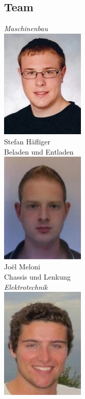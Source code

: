 \subsection{Team}

\begin{minipage}{0.49\textwidth}
\begin{flushleft} \large
\emph{Maschinenbau}\\
\includegraphics[width=0.3\textwidth]{./04_Projektmanagement/fig/stefanhaefliger.jpg}\\
Stefan Häfliger\\
Beladen und Entladen\\
\includegraphics[width=0.3\textwidth]{./04_Projektmanagement/fig/joelmeloni.jpg}\\
Joël Meloni\\
Chassis und Lenkung\\
\emph{Elektrotechnik}\\
\includegraphics[width=0.3\textwidth]{./04_Projektmanagement/fig/silvanritz.jpg}\\

\end{flushleft}
\end{minipage}
